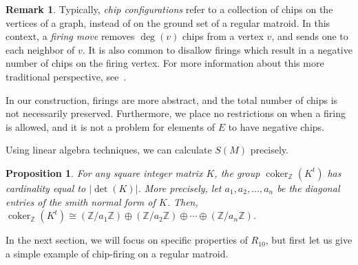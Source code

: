 \documentclass[12p]{amsart}
\numberwithin{equation}{section}
\theoremstyle{plain}
\newtheorem{prop}[thm]{Proposition}
\theoremstyle{definition}
\newtheorem{remark}[thm]{Remark}
\newcommand{\Z}{\mathbb {Z}}
\DeclareMathOperator{\coker}{coker}
\begin{document}
\begin{remark}\label{rem:traditional}
    Typically, \emph{chip configurations} refer to a collection of chips on the vertices of a graph, instead of on the ground set of a regular matroid. In this context, a \emph{firing move} removes $\deg(v)$ chips from a vertex $v$, and sends one to each neighbor of $v$. It is also common to disallow firings which result in a negative number of chips on the firing vertex. For more information about this more traditional perspective, see~\cite{Klivans}. 
    
    In our construction, firings are more abstract, and the total number of chips is not necessarily preserved. Furthermore, we place no restrictions on when a firing is allowed, and it is not a problem for elements of $E$ to have negative chips. 
\end{remark}

Using linear algebra techniques, we can calculate $S(M)$ precisely. 

\begin{prop}\cite[Section 8]{Biggs99}\label{prop:smith_normal}
    For any square integer matrix $K$, the group $\coker_{\Z}(K^t)$ has cardinality equal to $|\det(K)|$. More precisely, let $a_1,a_2, \dots, a_n$ be the diagonal entries of the \emph{smith normal form} of $K$. Then, $\coker_{\Z}(K^t) \cong (\Z/{a_1}\Z) \oplus (\Z/{a_2}\Z) \oplus \cdots \oplus (\Z/{a_n}\Z)$.
\end{prop} 

In the next section, we will focus on specific properties of $R_{10}$, but first let us give a simple example of chip-firing on a regular matroid. 
\end{document}
